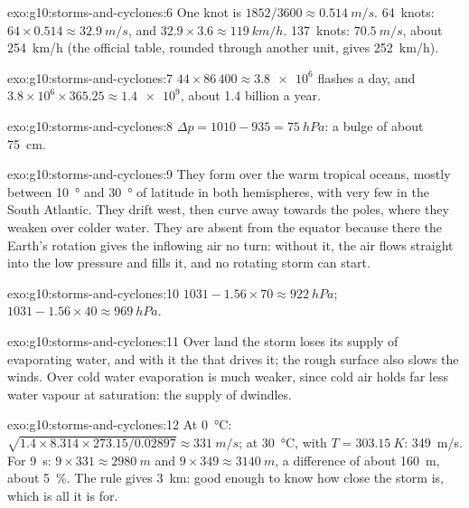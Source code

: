 \begin{solution}{exo:g10:storms-and-cyclones:6}
One knot is $1852/3600 \approx \qty{0.514}{m/s}$. \num{64}~knots: $64 \times
0.514 \approx \qty{32.9}{m/s}$, and $32.9 \times 3.6 \approx
\qty{119}{km/h}$. \num{137}~knots: $\qty{70.5}{m/s}$, about
\qty{254}{km/h} (the official table, rounded through another unit, gives
\qty{252}{km/h}).
\end{solution}

\begin{solution}{exo:g10:storms-and-cyclones:7}
$44 \times 86\,400 \approx \num{3.8e6}$ flashes a day, and $3.8\times10^6
\times 365.25 \approx \num{1.4e9}$, about 1.4 billion a year.
\end{solution}

\begin{solution}{exo:g10:storms-and-cyclones:8}
$\Delta p = 1010 - 935 = \qty{75}{hPa}$: a bulge of about \qty{75}{cm}.
\end{solution}

\begin{solution}{exo:g10:storms-and-cyclones:9}
They form over the warm tropical oceans, mostly between \qty{10}{\degree} and
\qty{30}{\degree} of latitude in both hemispheres, with very few in the South
Atlantic. They drift west, then curve away towards the poles, where they
weaken over colder water. They are absent from the equator because there the
Earth's rotation gives the inflowing air no turn: without it, the air flows
straight into the low pressure and fills it, and no rotating storm can start.
\end{solution}

\begin{solution}{exo:g10:storms-and-cyclones:10}
$1031 - 1.56 \times 70 \approx \qty{922}{hPa}$; $1031 - 1.56 \times 40
\approx \qty{969}{hPa}$.
\end{solution}

\begin{solution}{exo:g10:storms-and-cyclones:11}
Over land the storm loses its supply of evaporating water, and with it the
 that drives it; the rough surface also slows the winds. Over cold
water evaporation is much weaker, since cold air holds far less water vapour
at saturation: the supply of  dwindles.
\end{solution}

\begin{solution}{exo:g10:storms-and-cyclones:12}
At \qty{0}{\degreeCelsius}: $\sqrt{1.4 \times 8.314 \times 273.15/0.02897}
\approx \qty{331}{m/s}$; at \qty{30}{\degreeCelsius}, with $T =
\qty{303.15}{K}$: \qty{349}{m/s}. For \qty{9}{s}: $9 \times 331 \approx
\qty{2980}{m}$ and $9 \times 349 \approx \qty{3140}{m}$, a difference of
about \qty{160}{m}, about \qty{5}{\percent}. The rule gives \qty{3}{km}:
good enough to know how close the storm is, which is all it is for.
\end{solution}

